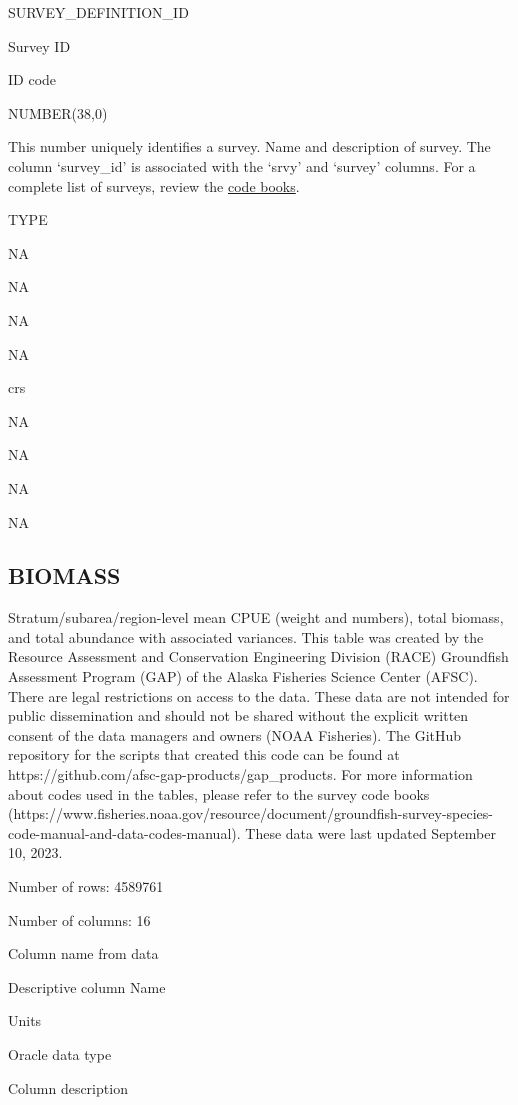 \documentclass[
  letterpaper,
  oneside,
  open=any]{scrbook}
\begin{document}
SURVEY\_DEFINITION\_ID

Survey ID

ID code

NUMBER(38,0)

This number uniquely identifies a survey. Name and description of
survey. The column `survey\_id' is associated with the `srvy' and
`survey' columns. For a complete list of surveys, review the
\href{https://www.fisheries.noaa.gov/resource/document/groundfish-survey-species-code-manual-and-data-codes-manual}{code
books}.

TYPE

NA

NA

NA

NA

crs

NA

NA

NA

NA

\hypertarget{biomass}{%
\subsection{BIOMASS}\label{biomass}}

Stratum/subarea/region-level mean CPUE (weight and numbers), total
biomass, and total abundance with associated variances. This table was
created by the Resource Assessment and Conservation Engineering Division
(RACE) Groundfish Assessment Program (GAP) of the Alaska Fisheries
Science Center (AFSC). There are legal restrictions on access to the
data. These data are not intended for public dissemination and should
not be shared without the explicit written consent of the data managers
and owners (NOAA Fisheries). The GitHub repository for the scripts that
created this code can be found at
https://github.com/afsc-gap-products/gap\_products. For more information
about codes used in the tables, please refer to the survey code books
(https://www.fisheries.noaa.gov/resource/document/groundfish-survey-species-code-manual-and-data-codes-manual).
These data were last updated September 10, 2023.

Number of rows: 4589761

Number of columns: 16

Column name from data

Descriptive column Name

Units

Oracle data type

Column description
\end{document}
